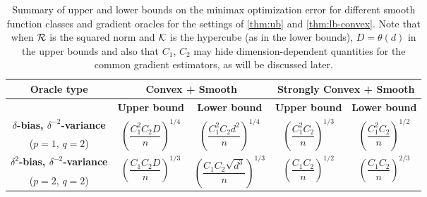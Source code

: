 \begin{table*}
\small
\centering
\label{tab:mse-1}
 \begin{tabular}{|c|c|c|c|c|}
\toprule
  \multirow{2}{*}{\textbf{Oracle type}} & \multicolumn{2}{c}{\multirow{2}{*}{\textbf{Convex + Smooth}}} & \multicolumn{2}{|c|}{\multirow{2}{*}{\textbf{Strongly Convex + Smooth}}} \\[1em]
 \midrule
 & \textbf{Upper bound} & \textbf{Lower bound} & \textbf{Upper bound} & \textbf{Lower bound}\\
 \midrule
\textbf{ $\delta$-bias, $\delta^{-2}$-variance} & \multirow{2}{*}{$\left(\dfrac{C_1^{2}C_2 D}{n}\right)^{1/4}$}  & \multirow{2}{*}{$\left(\dfrac{C_1^2 C_2 d^2}{n}\right)^{1/4}$}& \multirow{2}{*}{$\left(\dfrac{C_1^2 C_2}{n}\right)^{1/3}$}  & \multirow{2}{*}{$\left(\dfrac{C_1^2 C_2}{ n}\right)^{1/2}$} \\[0.5ex]
 ($p=1$, $q=2$) & & & &\\\midrule
\textbf{$\delta^2$-bias, $\delta^{-2}$-variance } & \multirow{2}{*}{$\left(\dfrac{C_1 C_2 D}{n}\right)^{1/3}$}  & \multirow{2}{*}{$\left(\dfrac{C_1 C_2 \sqrt{d^3}}{n}\right)^{1/3}$} & \multirow{2}{*}{$\left(\dfrac{C_1 C_2}{n}\right)^{1/2}$}  & \multirow{2}{*}{$\left(\dfrac{C_1 C_2 }{ n}\right)^{2/3}$}\\[1.4ex]
 ($p=2$, $q=2$) & & & &\\
\bottomrule
\end{tabular}
\caption{Summary of upper and lower bounds on the minimax optimization error for different smooth function classes and  gradient oracles for the settings of \cref{thm:ub} and \cref{thm:lb-convex}. Note that when $\mathcal{R}$ is the squared norm and $\mathcal{K}$ is the hypercube (as in the lower bounds), $D=\theta(d)$ in the upper bounds and also that $C_1$, $C_2$ may hide dimension-dependent quantities for the common gradient estimators, as will be discussed later.}
\end{table*}


